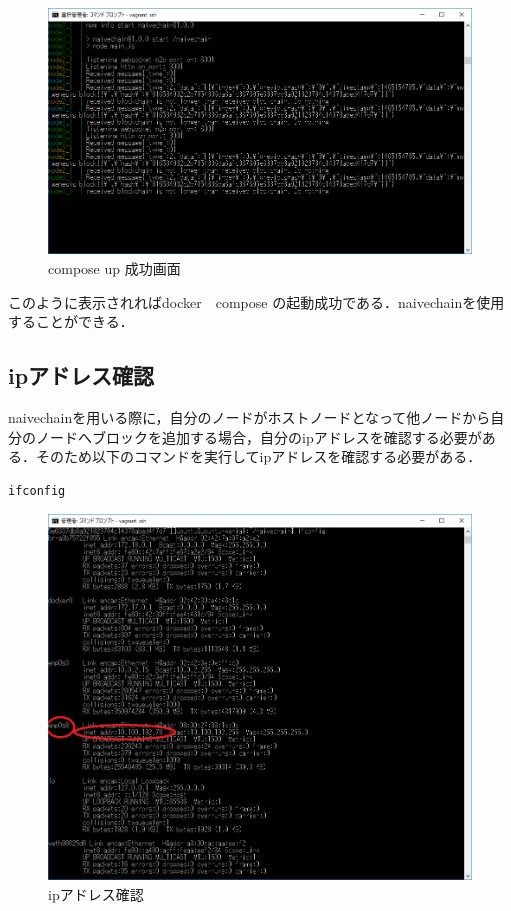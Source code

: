 \newpage


\begin{figure}[h]
\centering
\includegraphics[width=12cm]{composeup3.PNG}
\caption{compose up 成功画面}\label{サンプル図}
\end{figure}


このように表示されればdocker　compose の起動成功である．naivechainを使用することができる．


\newpage


\subsection{ipアドレス確認}

naivechainを用いる際に，自分のノードがホストノードとなって他ノードから自分のノードへブロックを追加する場合，自分のipアドレスを確認する必要がある．そのため以下のコマンドを実行してipアドレスを確認する必要がある．


\begin{verbatim}
ifconfig
\end{verbatim}

\begin{figure}[h]
\centering
\includegraphics[width=12cm]{ifconfig.PNG}
\caption{ipアドレス確認}\label{サンプル図}
\end{figure}



